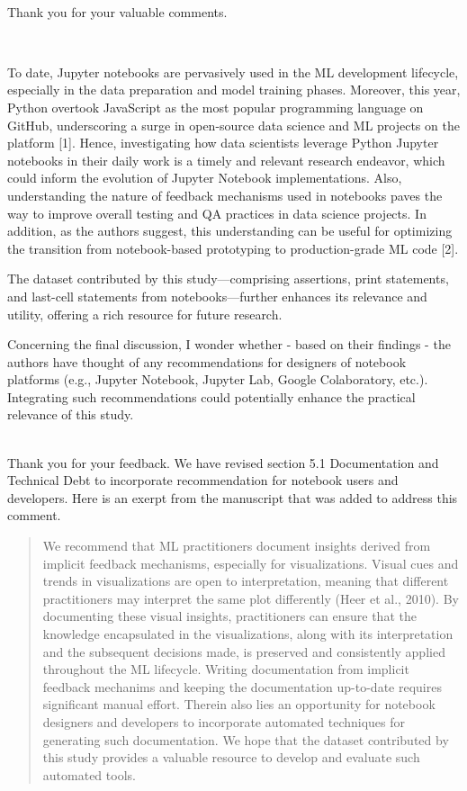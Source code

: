 \documentclass[11pt,fleqn]{article}
\newcommand{\eline}{\vspace*{.75\baselineskip}}
\newcommand{\Referee}[1]{\eline \noindent {\bf Reviewer comment #1:} \\}
\newcommand{\Us}{\eline \noindent {\bf Response:}\\}
\newenvironment{revcomment}[1][]
{\Referee{#1}\begin{rcomment}}
{\end{rcomment}}
\begin{document}
\Us Thank you for your valuable comments.

\begin{revcomment}[1.2]
  To date, Jupyter notebooks are pervasively used in the ML development lifecycle, especially in the data preparation and model training phases. Moreover, this year, Python overtook JavaScript as the most popular programming language on GitHub, underscoring a surge in open-source data science and ML projects on the platform [1]. Hence, investigating how data scientists leverage Python Jupyter notebooks in their daily work is a timely and relevant research endeavor, which could inform the evolution of Jupyter Notebook implementations. Also, understanding the nature of feedback mechanisms used in notebooks paves the way to improve overall testing and QA practices in data science projects. In addition, as the authors suggest, this understanding can be useful for optimizing the transition from notebook-based prototyping to production-grade ML code [2].

  The dataset contributed by this study—comprising assertions, print statements, and last-cell statements from notebooks—further enhances its relevance and utility, offering a rich resource for future research.

  Concerning the final discussion, I wonder whether - based on their findings - the authors have thought of any recommendations for designers of notebook platforms (e.g., Jupyter Notebook, Jupyter Lab, Google Colaboratory, etc.). Integrating such recommendations could potentially enhance the practical relevance of this study.
\end{revcomment}

\Us Thank you for your feedback. We have revised section 5.1 Documentation and Technical Debt to incorporate recommendation for notebook users and developers. Here is an exerpt from the manuscript that was added to address this comment.

\begin{quote}
  We recommend that ML practitioners document insights derived from implicit feedback mechanisms, especially for visualizations. Visual cues and trends in visualizations are open to interpretation, meaning that different practitioners may interpret the same plot differently (Heer et al., 2010). By documenting these visual insights, practitioners can ensure that the knowledge encapsulated in the visualizations, along with its interpretation and the subsequent decisions made, is preserved and consistently applied throughout the ML lifecycle. Writing documentation from implicit feedback mechanims and keeping the documentation up-to-date requires significant manual effort. Therein also lies an opportunity for notebook designers and developers to incorporate automated techniques for generating such documentation. We hope that the dataset contributed by this study provides a valuable resource to develop and evaluate such automated tools.
\end{quote}
\end{document}
